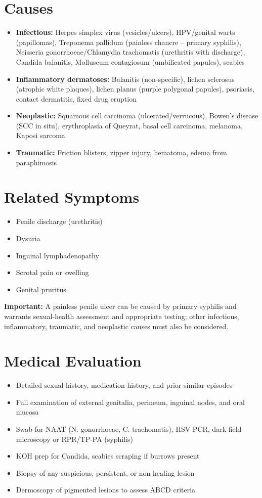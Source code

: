 \section*{Causes}
\begin{itemize}
  \item \textbf{Infectious:} Herpes simplex virus (vesicles/ulcers), HPV/genital warts (papillomas), Treponema pallidum (painless chancre -- primary syphilis), Neisseria gonorrhoeae/Chlamydia trachomatis (urethritis with discharge), Candida balanitis, Molluscum contagiosum (umbilicated papules), scabies
  \item \textbf{Inflammatory dermatoses:} Balanitis (non-specific), lichen sclerosus (atrophic white plaques), lichen planus (purple polygonal papules), psoriasis, contact dermatitis, fixed drug eruption
  \item \textbf{Neoplastic:} Squamous cell carcinoma (ulcerated/verrucous), Bowen's disease (SCC in situ), erythroplasia of Queyrat, basal cell carcinoma, melanoma, Kaposi sarcoma
  \item \textbf{Traumatic:} Friction blisters, zipper injury, hematoma, edema from paraphimosis
\end{itemize}

\section*{Related Symptoms}
\begin{itemize}
  \item Penile discharge (urethritis)
  \item Dysuria
  \item Inguinal lymphadenopathy
  \item Scrotal pain or swelling
  \item Genital pruritus
\end{itemize}
\textbf{Important:} A painless penile ulcer can be caused by primary syphilis and warrants sexual-health assessment and appropriate testing; other infectious, inflammatory, traumatic, and neoplastic causes must also be considered.

\section*{Medical Evaluation}
\begin{itemize}
  \item Detailed sexual history, medication history, and prior similar episodes
  \item Full examination of external genitalia, perineum, inguinal nodes, and oral mucosa
  \item Swab for NAAT (N. gonorrhoeae, C. trachomatis), HSV PCR, dark-field microscopy or RPR/TP-PA (syphilis)
  \item KOH prep for Candida, scabies scraping if burrows present
  \item Biopsy of any suspicious, persistent, or non-healing lesion
  \item Dermoscopy of pigmented lesions to assess ABCD criteria
\end{itemize}

